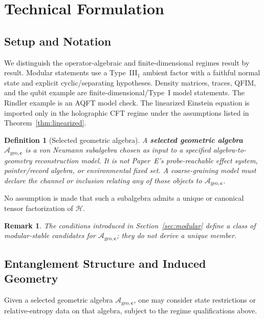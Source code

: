 \documentclass[12pt,a4paper]{article}
\newtheorem{definition}[theorem]{Definition}
\newtheorem{remark}[theorem]{Remark}
\begin{document}
\section{Technical Formulation}
\label{sec:technical}

\subsection{Setup and Notation}

We distinguish the operator-algebraic and finite-dimensional regimes result by result.  Modular statements use a Type~III$_1$ ambient factor with a faithful normal state and explicit cyclic/separating hypotheses.  Density matrices, traces, QFIM, and the qubit example are finite-dimensional/Type~I model statements.  The Rindler example is an AQFT model check.  The linearized Einstein equation is imported only in the holographic CFT regime under the assumptions listed in Theorem~\ref{thm:linearized}.

\begin{definition}[Selected geometric algebra]
\label{def:accessible}
A \textbf{selected geometric algebra} $\mathcal{A}_{\mathrm{geo},\mathbf{c}}$ is a von Neumann subalgebra chosen as input to a specified algebra-to-geometry reconstruction model.  It is not Paper~E's probe-reachable effect system, pointer/record algebra, or environmental fixed set.  A coarse-graining model must declare the channel or inclusion relating any of those objects to $\mathcal{A}_{\mathrm{geo},\mathbf{c}}$.
\end{definition}

No assumption is made that such a subalgebra admits a unique or canonical tensor factorization of $\mathcal{H}$.

\begin{remark}
The conditions introduced in Section~\ref{sec:modular} define a class of modular-stable candidates for $\mathcal{A}_{\mathrm{geo},\mathbf{c}}$; they do not derive a unique member.
\end{remark}

\subsection{Entanglement Structure and Induced Geometry}

Given a selected geometric algebra $\mathcal{A}_{\mathrm{geo},\mathbf{c}}$, one may consider state restrictions or relative-entropy data on that algebra, subject to the regime qualifications above.
\end{document}
